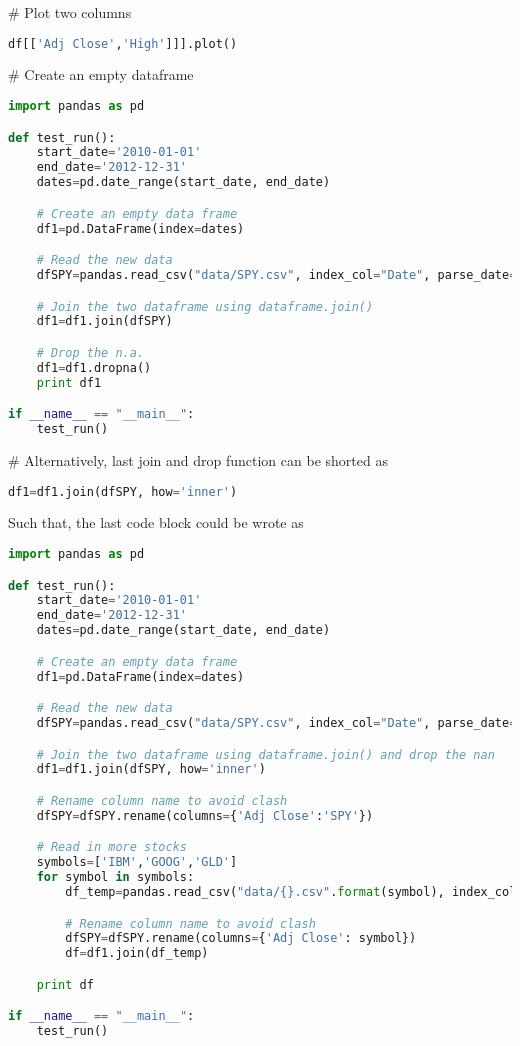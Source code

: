 \documentclass{article}
\begin{document}
\# Plot two columns
\begin{lstlisting}[language=Python]
df[['Adj Close','High']]].plot()
\end{lstlisting}

\# Create an empty dataframe
\begin{lstlisting}[language=Python]
import pandas as pd

def test_run():
    start_date='2010-01-01'
    end_date='2012-12-31'
    dates=pd.date_range(start_date, end_date)

    # Create an empty data frame
    df1=pd.DataFrame(index=dates)

    # Read the new data
    dfSPY=pandas.read_csv("data/SPY.csv", index_col="Date", parse_date=True, usecols=['Date','Adj Close'],na_values=['nan'])

    # Join the two dataframe using dataframe.join()
    df1=df1.join(dfSPY)

    # Drop the n.a.
    df1=df1.dropna()
    print df1

if __name__ == "__main__":
    test_run()
\end{lstlisting}

\# Alternatively, last join and drop function can be shorted as 
\begin{lstlisting}[language=Python]
df1=df1.join(dfSPY, how='inner')
\end{lstlisting}

Such that, the last code block could be wrote as
\begin{lstlisting}[language=Python]
import pandas as pd

def test_run():
    start_date='2010-01-01'
    end_date='2012-12-31'
    dates=pd.date_range(start_date, end_date)

    # Create an empty data frame
    df1=pd.DataFrame(index=dates)

    # Read the new data
    dfSPY=pandas.read_csv("data/SPY.csv", index_col="Date", parse_date=True, usecols=['Date','Adj Close'],na_values=['nan'])

    # Join the two dataframe using dataframe.join() and drop the nan
    df1=df1.join(dfSPY, how='inner')

    # Rename column name to avoid clash
    dfSPY=dfSPY.rename(columns={'Adj Close':'SPY'})

    # Read in more stocks
    symbols=['IBM','GOOG','GLD']
    for symbol in symbols:
        df_temp=pandas.read_csv("data/{}.csv".format(symbol), index_col="Date", parse_date=True, usecols=['Date','Adj Close'],na_values=['nan'])

        # Rename column name to avoid clash
        dfSPY=dfSPY.rename(columns={'Adj Close': symbol})
        df=df1.join(df_temp)

    print df

if __name__ == "__main__":
    test_run()
\end{lstlisting}
\end{document}
